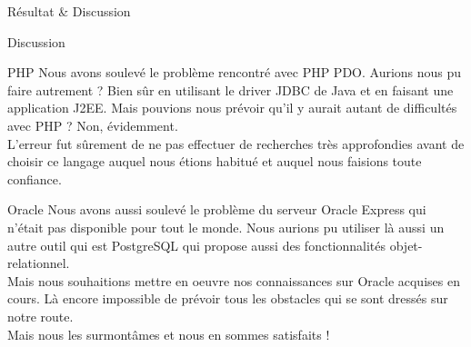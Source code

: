 \documentclass[a4paper, 12pt]{report}
\begin{document}
\begin{chapter}{Résultat \& Discussion}
\begin{section}{Discussion}
	\begin{subsection}{PHP}
		Nous avons soulevé le problème rencontré avec PHP PDO. Aurions nous pu faire autrement ? Bien sûr en utilisant le driver JDBC de Java et en faisant une 
		application J2EE. Mais pouvions nous prévoir qu'il y aurait autant de difficultés avec PHP ? Non, évidemment.\\
		L'erreur fut sûrement de ne pas effectuer de recherches très approfondies avant de choisir ce langage auquel nous étions habitué et auquel nous faisions
		toute confiance.
	\end{subsection}

	\begin{subsection}{Oracle}
		Nous avons aussi soulevé le problème du serveur Oracle Express qui n'était pas disponible pour tout le monde. Nous aurions pu utiliser là aussi un autre
		outil qui est PostgreSQL qui propose aussi des fonctionnalités objet-relationnel.\\
		Mais nous souhaitions mettre en oeuvre nos connaissances sur Oracle acquises en cours. Là encore impossible de prévoir tous les obstacles qui se sont
		dressés sur notre route. \\
		Mais nous les surmontâmes et nous en sommes satisfaits !
	\end{subsection}
	\end{section}


\end{chapter}
\end{document}
